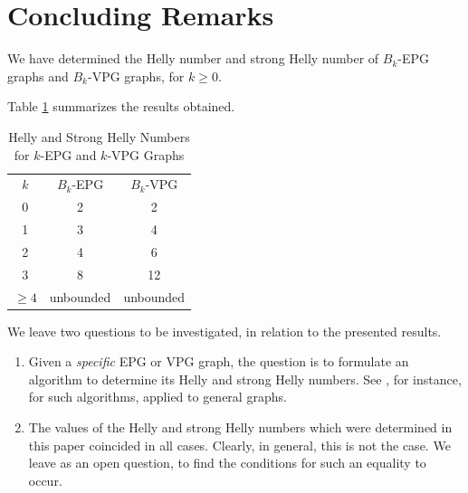 \section{Concluding Remarks}\label{sec:finalRemarks4}
We have determined the Helly number and strong Helly number of $B_k$-EPG graphs and $B_k$-VPG graphs, for $k \geq 0$. 

Table \ref{tab:Helly-Strong-Helly} summarizes the results obtained.
 
\Large 

\begin{table}
    \centering
    \begin{tabular}{c|c|c}
    \cline{1-3} $k$  & $B_k$-EPG & $B_k$-VPG \\
    \cline{1-3} 0 & 2 & 2 \\
    \cline{1-3} 1 & 3 & 4 \\
    \cline{1-3} 2 & 4 & 6 \\
    \cline{1-3} 3 & 8 & 12 \\
    \cline{1-3} $\geq 4$ & unbounded & unbounded \\
    \cline{1-3} 
    \end{tabular}
    \caption{Helly and Strong Helly Numbers for $k$-EPG and $k$-VPG Graphs}
    \label{tab:Helly-Strong-Helly}
\end{table}

\normalsize


We leave two questions to be investigated, in relation to the presented results.

\begin{enumerate}
\item Given a {\it specific}  EPG or VPG graph, the question is to formulate an algorithm to determine its Helly and strong Helly numbers. See \cite{dourado2008improved}, for instance, for such algorithms, applied to general graphs. 

\item The values of the Helly and strong Helly numbers which were determined in this paper coincided in all cases. Clearly, in general, this is not the case. We leave as an open question, to find the conditions for such an equality to occur. 
\end{enumerate}



